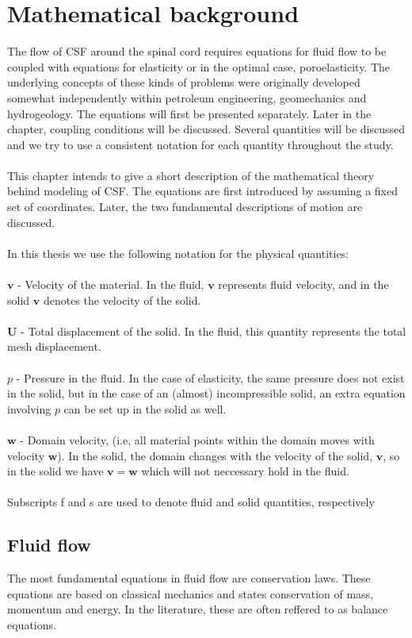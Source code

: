 \chapter{Mathematical background}
The flow of CSF around the spinal cord requires equations for fluid flow to be coupled with equations for elasticity or in the optimal case, poroelasticity. The underlying concepts of these kinds of problems were originally developed somewhat independently within petroleum engineering, geomechanics and hydrogeology. The equations will first be presented separately. Later in the chapter, coupling conditions will be discussed. Several quantities will be discussed and we try to use a consistent notation for each quantity throughout the study. 
\\
\\
This chapter intends to give a short description of the mathematical theory behind modeling of CSF. The equations are first introduced by assuming a fixed set of coordinates. Later, the two fundamental descriptions of motion are discussed. \\
\\
In this thesis we use the following notation for the physical quantities: \\ \\
$\mathbf{v}$ - Velocity of the material. In the fluid, $\mathbf{v}$ represents fluid velocity, and in the solid $\mathbf{v}$ denotes the velocity of the solid.
\\ \\
$ \mathbf{U}$ - Total displacement of the solid. In the fluid, this quantity represents the total mesh displacement. 
\\
\\
$p$ - Pressure in the fluid. In the case of elasticity, the same pressure does not exist in the solid, but in the case of an (almost) incompressible solid, an extra equation involving $p$ can be set up in the solid as well. 
\\
\\
$\mathbf{w}$ - Domain velocity, (i.e, all material points within the domain moves with velocity $\mathbf{w}$). In the solid, the domain changes with the velocity of the solid, $\mathbf{v}$, so in the solid we have $\mathbf{v} = \mathbf{w}$ which will not neccessary hold in the fluid.
\\
\\
Subscripts f and s are used to denote fluid and solid quantities, respectively
\section{Fluid flow}
The most fundamental equations in fluid flow are conservation laws. These equations are based on classical mechanics and states conservation of mass, momentum and energy. In the literature, these are often reffered to as balance equations.

